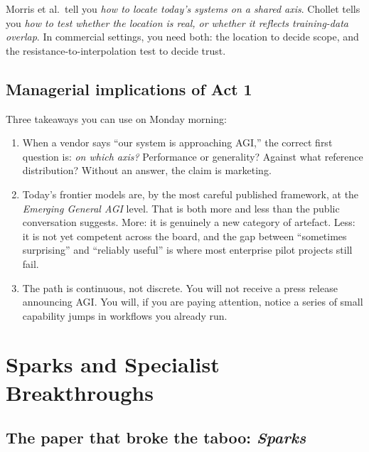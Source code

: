 \documentclass[11pt,a4paper]{article}
\begin{document}
\begin{keyinsight}
Morris et al.\ tell you \emph{how to locate today's systems on a shared
axis}. Chollet tells you \emph{how to test whether the location is
real, or whether it reflects training-data overlap}. In commercial
settings, you need both: the location to decide scope, and the
resistance-to-interpolation test to decide trust.
\end{keyinsight}

\subsection{Managerial implications of Act 1}

Three takeaways you can use on Monday morning:

\begin{enumerate}[leftmargin=1.4em]
  \item When a vendor says ``our system is approaching AGI,'' the
        correct first question is: \emph{on which axis?} Performance
        or generality? Against what reference distribution? Without an
        answer, the claim is marketing.
  \item Today's frontier models are, by the most careful published
        framework, at the \emph{Emerging General AGI} level. That is
        both more and less than the public conversation suggests. More:
        it is genuinely a new category of artefact. Less: it is not
        yet competent across the board, and the gap between ``sometimes
        surprising'' and ``reliably useful'' is where most enterprise
        pilot projects still fail.
  \item The path is continuous, not discrete. You will not receive a
        press release announcing AGI. You will, if you are paying
        attention, notice a series of small capability jumps in
        workflows you already run.
\end{enumerate}

\section{Sparks and Specialist Breakthroughs}\label{sec:act2}

\subsection{The paper that broke the taboo: \emph{Sparks}}
\end{document}
